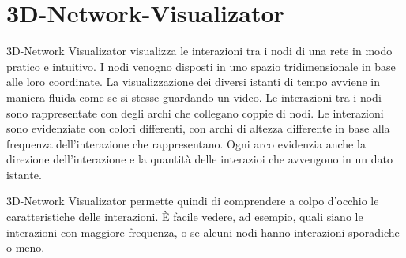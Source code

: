 \documentclass[a4paper,12pt]{article}
\begin{document}
% 

\section{3D-Network-Visualizator}
3D-Network Visualizator visualizza le interazioni tra i nodi di una rete in modo pratico e intuitivo. I nodi venogno disposti in uno spazio tridimensionale in base alle loro coordinate. La visualizzazione dei diversi istanti di tempo avviene in maniera fluida come se si stesse guardando un video. Le interazioni tra i nodi sono rappresentate con degli archi che collegano coppie di nodi. Le interazioni sono evidenziate con colori differenti, con archi di altezza differente in base alla frequenza dell'interazione che rappresentano. Ogni arco evidenzia anche la direzione dell'interazione e la quantit\`a delle interazioi che avvengono in un dato istante.

3D-Network Visualizator permette quindi di comprendere a colpo d'occhio le caratteristiche delle interazioni. \`E facile vedere, ad esempio, quali siano le interazioni con maggiore frequenza, o se alcuni nodi hanno interazioni sporadiche o meno.
\end{document}
